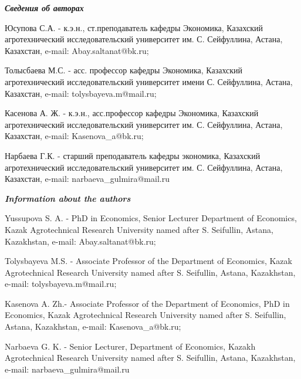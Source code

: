 \begin{authorinfo}
\emph{{\bfseries Сведения об авторах}}

Юсупова С.А. - к.э.н., ст.преподаватель кафедры Экономика, Казахский
агротехнический исследовательский университет им. С. Сейфуллина, Астана,
Казахстан, e-mail: Abay.saltanat@bk.ru;

Толысбаева М.С. - асс. профессор кафедры Экономика, Казахский
агротехнический исследовательский университет имени С. Сейфуллина,
Астана, Казахстан, e-mail: tolysbayeva.m@mail.ru;

Касенова А. Ж. - к.э.н., асс.профессор кафедры Экономика, Казахский
агротехнический исследовательский университет им. С. Сейфуллина, Астана,
Казахстан, e-mail: Kasenova\_a@bk.ru;

Нарбаева Г.К. - старший преподаватель кафедры экономика, Казахский
агротехнический исследовательский университет им. С. Сейфуллина, Астана,
Казахстан, e-mail: narbaeva\_gulmira@mail.ru

\emph{{\bfseries Information about the authors}}

Yussupova S. A. - PhD in Economics, Senior Lecturer Department of
Economics, Kazak Agrotechnical Research University named after S.
Seifullin, Astana, Kazakhstan, e-mail: Abay.saltanat@bk.ru;

Tolysbayeva M.S. - Associate Professor of the Department of Economics,
Kazak Agrotechnical Research University named after S. Seifullin,
Astana, Kazakhstan, e-mail: tolysbayeva.m@mail.ru;

Kasenova A. Zh.- Associate Professor of the Department of Economics, PhD
in Economics, Kazak Agrotechnical Research University named after S.
Seifullin, Astana, Kazakhstan, e-mail: Kasenova\_a@bk.ru;

Narbaeva G. K. - Senior Lecturer, Department of Economics, Kazakh
Agrotechnical Research University named after S. Seifullin, Astana,
Kazakhstan, e-mail: narbaeva\_gulmira@mail.ru
\end{authorinfo}

